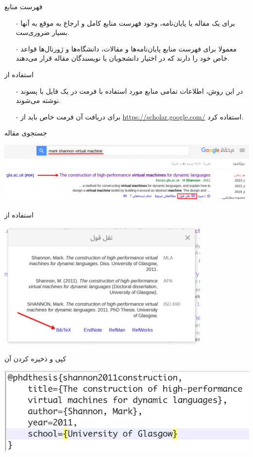 \begin{frame}{فهرست منابع}
\begin{itemize}\itemr
\item[-]
برای یک مقاله یا پایان‌نامه، وجود فهرست منابع کامل و ارجاع به موقع به آنها بسیار ضروری‌ست.

\item[-]
معمولا برای فهرست منابع پایان‌نامه‌ها و مقالات، دانشگاه‌ها و ژورنال‌ها قواعد خاص خود را دارند که در اختیار دانشجویان یا نویسندگان مقاله قرار می‌دهند.
\end{itemize}
\end{frame}

\begin{frame}{استفاده از }
\begin{itemize}\itemr
\item[-]
در این روش، اطلاعات تمامی منابع مورد استفاده با فرمت 
در یک فایل با پسوند  نوشته می‌شوند.

\item[-]
برای دریافت آن فرمت خاص باید از 
\url{https://scholar.google.com/}
استفاده کرد.
\end{itemize}
\end{frame}

\begin{frame}{جستجوی مقاله}
\begin{center}
\includegraphics[width=\textwidth]{docs/images/search}
\end{center}
\end{frame}

\begin{frame}{استفاده از }
\begin{center}
\includegraphics[width=0.8\textwidth, height=0.8\textheight]{docs/images/bibtex}
\end{center}
\end{frame}

\begin{frame}{کپی و ذخیره‌ کردن آن}
\begin{center}
\includegraphics[width=\textwidth]{docs/images/copy-save}
\end{center}
\end{frame}
